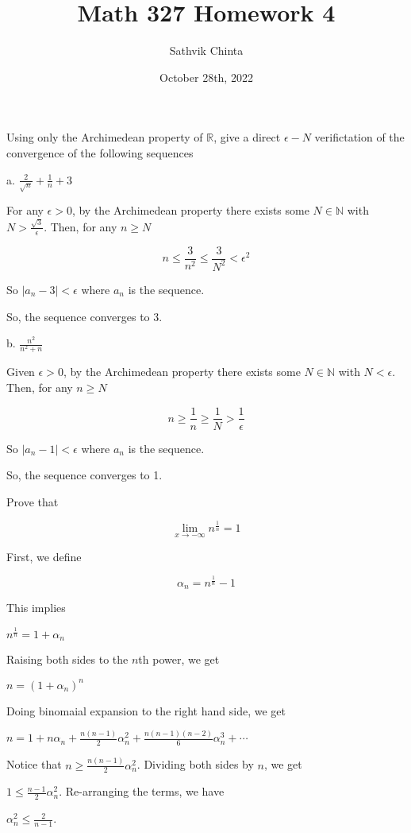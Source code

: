 \documentclass[addpoints]{exam}
\title{Math 327 Homework 4}
\author{Sathvik Chinta}
\date{October 28th, 2022}
\begin{document}
\maketitle

\begin{questions}
\question Using only the Archimedean property of $\mathbb{R}$, give a direct $\epsilon - N$ verifictation of the convergence
of the following sequences

a. $\frac{2}{\sqrt{n}} + \frac{1}{n} + 3$

For any $\epsilon > 0$, by the Archimedean property there exists some $N \in \mathbb{N}$ with
$N > \frac{\sqrt{3}}{\epsilon}$. Then, for any $n \geq N$

\[n \leq \frac{3}{n^2} \leq \frac{3}{N^2} < \epsilon^2\]

So $|a_n - 3| < \epsilon$ where $a_n$ is the sequence. 

So, the sequence converges to 3. 

b. $\frac{n^2}{n^2 + n}$

Given $\epsilon > 0$, by the Archimedean property there exists some $N \in \mathbb{N}$ with
$N < \epsilon$. Then, for any $n \geq N$

\[n \geq \frac{1}{n} \geq \frac{1}{N} > \frac{1}{\epsilon}\]

So $|a_n - 1| < \epsilon$ where $a_n$ is the sequence.

So, the sequence converges to 1.

\question Prove that 

\[\lim_{x \to -\infty} n^{\frac{1}{n}} = 1\]

First, we define 

\[\alpha_n = n^{\frac{1}{n}} - 1\]

This implies 

$n^{\frac{1}{n}} = 1 + \alpha_n $

Raising both sides to the $n$th power, we get

$n = (1 + \alpha_n)^n$

Doing binomaial expansion to the right hand side, we get

$n = 1 + n\alpha_n + \frac{n(n-1)}{2}\alpha_n^2 + \frac{n(n-1)(n-2)}{6}\alpha_n^3 + \cdots$

Notice that $n \geq \frac{n(n-1)}{2}\alpha_n^2$. Dividing both sides by $n$, we get 

$1 \leq \frac{n-1}{2}\alpha_n^2$. Re-arranging the terms, we have 

$\alpha_n^2 \leq \frac{2}{n-1}$. 


\end{questions}
\end{document}
